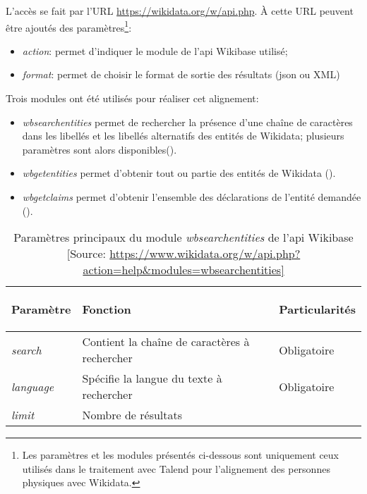 L'accès se fait par l'URL \url{https://wikidata.org/w/api.php}. À cette URL peuvent être ajoutés des paramètres\footnote{Les paramètres et les modules présentés ci-dessous sont uniquement ceux utilisés dans le traitement avec Talend pour l'alignement des personnes physiques avec Wikidata.}:
\begin{itemize}
	\item \textit{action}: permet d'indiquer le module de l'\ac{api} Wikibase utilisé;
	\item \textit{format}: permet de choisir le format de sortie des résultats (\ac{json} ou XML)
\end{itemize}
\medskip

Trois modules ont été utilisés pour réaliser cet alignement:
\begin{itemize}
	\item \textit{wbsearchentities} permet de rechercher la présence d'une chaîne de caractères dans les libellés et les libellés alternatifs des entités de Wikidata; plusieurs paramètres sont alors disponibles().
	\item \textit{wbgetentities} permet d'obtenir tout ou partie des entités de Wikidata ().
	\item \textit{wbgetclaims} permet d'obtenir l'ensemble des déclarations de l'entité demandée ().
\end{itemize}

\begin{table}[h!]
	\centering
	\begin{tabularx}{15cm}{|X|X|X|}
		\hline
		\begin{center}Paramètre\end{center}&\begin{center}Fonction\end{center}&\begin{center}Particularités\end{center}  \tabularnewline \hline
		\textit{search}&Contient la chaîne de caractères à rechercher&Obligatoire\tabularnewline \hline
		\textit{language}&Spécifie la langue du texte à rechercher&Obligatoire\tabularnewline \hline
		\textit{limit}&Nombre de résultats&\tabularnewline \hline
	\end{tabularx}
	\caption[Paramètres principaux du module \textit{wbsearchentities} de l'\ac{api} Wikibase]{Paramètres principaux du module \textit{wbsearchentities} de l'\ac{api} Wikibase [Source: \url{https://www.wikidata.org/w/api.php?action=help\&modules=wbsearchentities]}}
	\label{wbsearchentities}
\end{table}


